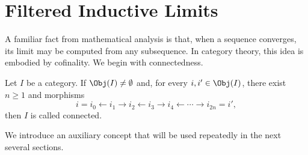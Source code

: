 
\section{Filtered Inductive Limits}\label{sec:filtered-indlim}
\hypertarget{o014.aljabr2.chapter1.filtered-inductive-limits}{ }
\enlargethispage{2\baselineskip}

A familiar fact from mathematical analysis is that, when a sequence
converges, its limit may be computed from any subsequence. In category theory,
this idea is embodied by cofinality. We begin with connectedness.

\begin{definition}
	Let $I$ be a category. If $\Obj(I) \neq \emptyset$ and, for every
	$i, i' \in \Obj(I)$, there exist $n \geq 1$ and morphisms
	\[ i = i_0 \leftarrow i_1 \to i_2 \leftarrow i_3 \to i_4 \leftarrow \cdots \to i_{2n} = i' , \]
	then $I$ is called connected.
\end{definition}

We introduce an auxiliary concept that will be used repeatedly in the next
several sections.

